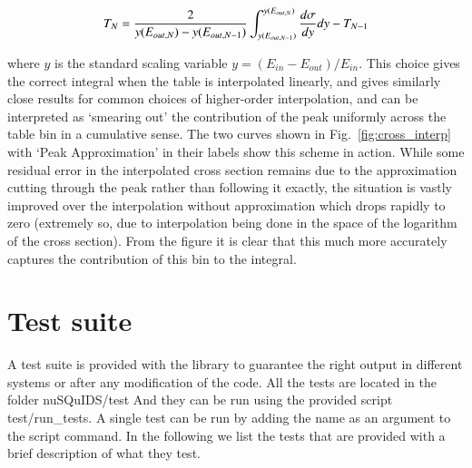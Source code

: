 \documentclass[3p,12pt]{elsarticle}
\newcommand{\ttf}{\ttfamily}
\begin{document}
\begin{equation}
  T_{N} = {2 \over y(E_{out,N}) - y(E_{out,N-1})}\int^{y(E_{out,N})}_{y(E_{out,N-1})}{{d\sigma \over dy} dy} - T_{N-1}
\end{equation}

where $y$ is the standard scaling variable $y = (E_{in} - E_{out}) / E_{in}$. 
This choice gives the correct integral when the table is interpolated linearly, and gives similarly close results for common choices of higher-order interpolation, and can be interpreted as `smearing out' the contribution of the peak uniformly across the table bin in a cumulative sense. 
The two curves shown in Fig.~\ref{fig:cross_interp} with `Peak Approximation' in their labels show this scheme in action. 
While some residual error in the interpolated cross section remains due to the approximation cutting through the peak rather than following it exactly, the situation is vastly improved over the interpolation without approximation which drops rapidly to zero (extremely so, due to interpolation being done in the space of the logarithm of the cross section). 
From the figure it is clear that this much more accurately captures the contribution of this bin to the integral. 


\section{Test suite}
\label{sec:tests}
A test suite is provided with the library to guarantee the right
output in different systems or after any modification of the
code. All the tests are located in the folder {\ttf nuSQuIDS/test}
And they can be run using the provided script {\ttf test/run\_tests}.
A single test can be run by adding the name as an argument to the script
command.
In the following we list the tests that are provided with a brief
description of what they test.
\end{document}
